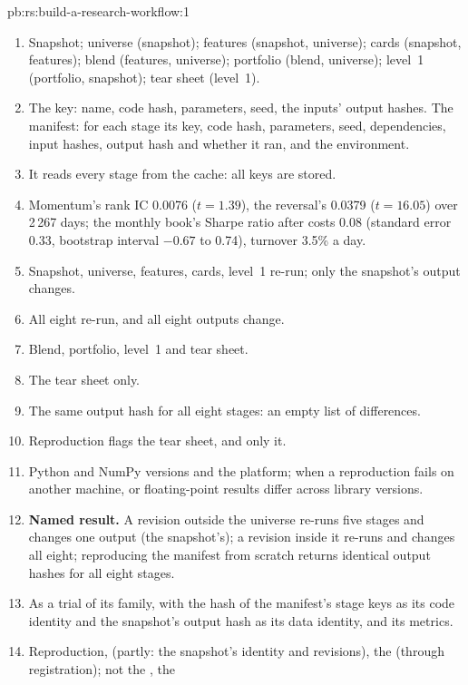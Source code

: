 \begin{solution}{pb:rs:build-a-research-workflow:1}
\begin{enumerate}
\item Snapshot; universe (snapshot); features (snapshot, universe); cards (snapshot, features); blend (features, universe); portfolio (blend, universe); level~1
(portfolio, snapshot); tear sheet (level~1).
\item The key: name, code hash, parameters, seed, the inputs' output hashes. The manifest: for each stage its key, code hash, parameters, seed, dependencies, input
hashes, output hash and whether it ran, and the environment.
\item It reads every stage from the cache: all keys are stored.
\item Momentum's rank IC 0.0076 ($t = 1.39$), the reversal's 0.0379 ($t = 16.05$) over 2\,267 days; the monthly book's Sharpe ratio after costs 0.08 (standard error
0.33, bootstrap interval $-0.67$ to 0.74), turnover 3.5\% a day.
\item Snapshot, universe, features, cards, level~1 re-run; only the snapshot's output changes.
\item All eight re-run, and all eight outputs change.
\item Blend, portfolio, level~1 and tear sheet.
\item The tear sheet only.
\item The same output hash for all eight stages: an empty list of differences.
\item Reproduction flags the tear sheet, and only it.
\item Python and NumPy versions and the platform; when a reproduction fails on another machine, or floating-point results differ across library versions.
\item \textbf{Named result.} A revision outside the universe re-runs five stages and changes one output (the snapshot's); a revision inside it re-runs and changes all
eight; reproducing the manifest from scratch returns identical output hashes for all eight stages.
\item As a trial of its family, with the hash of the manifest's stage keys as its code identity and the snapshot's output hash as its data identity, and its
metrics.
\item Reproduction,  (partly: the snapshot's identity and revisions), the  (through registration); not the , the

\end{enumerate}
\end{solution}
